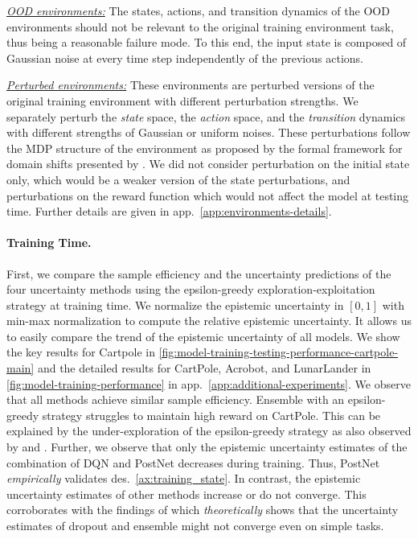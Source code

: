 \textit{\underline{OOD environments:}} The states, actions, and transition dynamics of the OOD environments should not be relevant to the original training environment task, thus being a reasonable failure mode. To this end, the input state is composed of Gaussian noise at every time step independently of the previous actions. 

\textit{\underline{Perturbed environments:}} These environments are perturbed versions of the original training environment with different perturbation strengths. We separately perturb the \emph{state} space, the \emph{action} space, and the \emph{transition} dynamics with different strengths of Gaussian or uniform noises. These perturbations follow the MDP structure of the environment as proposed by the formal framework for domain shifts presented by \citet{domain-shifts-rl}. We did not consider perturbation on the initial state only, which would be a weaker version of the state perturbations, and perturbations on the reward function which would not affect the model at testing time. Further details are given in app.~\ref{app:environments-details}.

\paragraph{Training Time.} First, we compare the sample efficiency and the uncertainty predictions of the four uncertainty methods using the epsilon-greedy exploration-exploitation strategy at training time. We normalize the epistemic uncertainty in $[0, 1]$ with min-max normalization to compute the relative epistemic uncertainty. It allows us to easily compare the trend of the epistemic uncertainty of all models. We show the key results for Cartpole in \cref{fig:model-training-testing-performance-cartpole-main} and the detailed results for CartPole, Acrobot, and LunarLander in \cref{fig:model-training-performance} in app.~\ref{app:additional-experiments}. We observe that all methods achieve similar sample efficiency. Ensemble with an epsilon-greedy strategy struggles to maintain high reward on CartPole. This can be explained by the under-exploration of the epsilon-greedy strategy as also observed by \citet{randomized-prior-functions} and \citet{dropout}. Further, we observe that only the epistemic uncertainty estimates of the combination of DQN and PostNet decreases during training. Thus, PostNet \emph{empirically} validates des.~\ref{ax:training_state}. In contrast, the epistemic uncertainty estimates of other methods increase or do not converge. This corroborates with the findings of \cite{randomized-prior-functions} which \emph{theoretically} shows that the uncertainty estimates of dropout and ensemble might not converge even on simple tasks.

